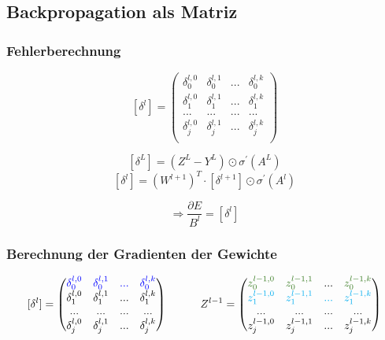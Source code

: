 \documentclass{article}
\begin{document}
 \subsection{Backpropagation als Matriz}

 \subsubsection{Fehlerberechnung}

 \[ [\delta^l] =
 \begin{pmatrix}
    \delta_0^{l,0} & \delta_0^{l,1} & ... & \delta_0^{l,k} \\
    \delta_1^{l,0} & \delta_1^{l,1} & ... & \delta_1^{l,k} \\
    ... & ... & ... & ... \\
    \delta_j^{l,0} & \delta_j^{l,1} & ... & \delta_j^{l,k} \\
 \end{pmatrix} \]

  \[ [\delta^L] = (Z^L - Y^L) \odot \sigma^{\prime}(A^L) \]
 \[ [\delta^l] = (W^{l+1})^T \cdot [\delta^{l+1}] \odot \sigma^{\prime}(A^l) \]

 \[ \Rightarrow  \frac{\partial E}{B^l} = [\delta^l]\]


\pagebreak


 \subsubsection{Berechnung der Gradienten der Gewichte}

 \[ [\delta^l] =
 \begin{pmatrix}
    \textcolor{blue}{\delta_0^{l,0}} & \textcolor{blue}{\delta_0^{l,1}} & \textcolor{blue}{...} & \textcolor{blue}{\delta_0^{l,k}} \\
    \delta_1^{l,0} & \delta_1^{l,1} & ... & \delta_1^{l,k} \\
    ... & ... & ... & ... \\
    \delta_j^{l,0} & \delta_j^{l,1} & ... & \delta_j^{l,k} \\
 \end{pmatrix} 
 \kern 30pt
 Z^{l-1} = 
 \begin{pmatrix}
    \textcolor{OliveGreen}{z_0^{l-1,0}} & \textcolor{OliveGreen}{z_0^{l-1,1}} & ... & \textcolor{OliveGreen}{z_0^{l-1,k}} \\
    \textcolor{Cyan}{z_1^{l-1,0}} & \textcolor{Cyan}{z_1^{l-1,1}} & \textcolor{Cyan}{...} & \textcolor{Cyan}{z_1^{l-1,k}} \\
    ... & ... & ... & ... \\
    z_j^{l-1,0} & z_j^{l-1,1} & ... & z_j^{l-1,k} \\
 \end{pmatrix} \]
\end{document}
